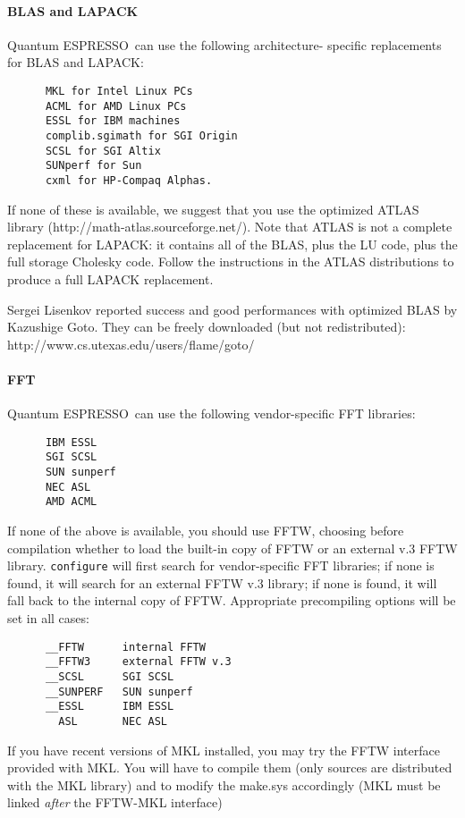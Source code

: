 \documentclass[12pt,a4paper]{article}
\def\qe{{\sc Quantum ESPRESSO}}
\begin{document}
\paragraph{BLAS and LAPACK} 
\qe\ can use the following architecture-
specific replacements for BLAS and LAPACK:
\begin{verbatim}
      MKL for Intel Linux PCs
      ACML for AMD Linux PCs
      ESSL for IBM machines
      complib.sgimath for SGI Origin
      SCSL for SGI Altix
      SUNperf for Sun
      cxml for HP-Compaq Alphas.
\end{verbatim}
If none of these is available, we suggest that you use the optimized ATLAS
library (http://math-atlas.sourceforge.net/). Note that ATLAS is not
a complete replacement for LAPACK: it contains all of the BLAS, plus the
LU code, plus the full storage Cholesky code. Follow the instructions in the
ATLAS distributions to produce a full LAPACK replacement.
    
Sergei Lisenkov reported success and good performances with optimized
BLAS by Kazushige Goto. They can be freely downloaded  (but not redistributed):
http://www.cs.utexas.edu/users/flame/goto/

\paragraph{FFT}
\qe\ can use the following vendor-specific FFT libraries:
\begin{verbatim}
      IBM ESSL
      SGI SCSL
      SUN sunperf
      NEC ASL
      AMD ACML
\end{verbatim}
If none of the above is available, you should use FFTW, choosing
before compilation whether to load the built-in copy of FFTW 
or an external v.3 FFTW library.
\texttt{configure} will first search for vendor-specific FFT libraries;
if none is found, it will search for an external FFTW v.3 library;
if none is found, it will fall back to the internal  copy of FFTW.
Appropriate precompiling options will be set in all cases:
\begin{verbatim}
      __FFTW      internal FFTW
      __FFTW3     external FFTW v.3
      __SCSL      SGI SCSL
      __SUNPERF   SUN sunperf 
      __ESSL      IBM ESSL
        ASL       NEC ASL
\end{verbatim}
If you have recent versions of MKL installed, you may try the 
FFTW interface provided with MKL. You will have to compile them
(only sources are distributed with the MKL library)
and to modify the make.sys accordingly (MKL must be linked {\em after}
the FFTW-MKL interface)
\end{document}

